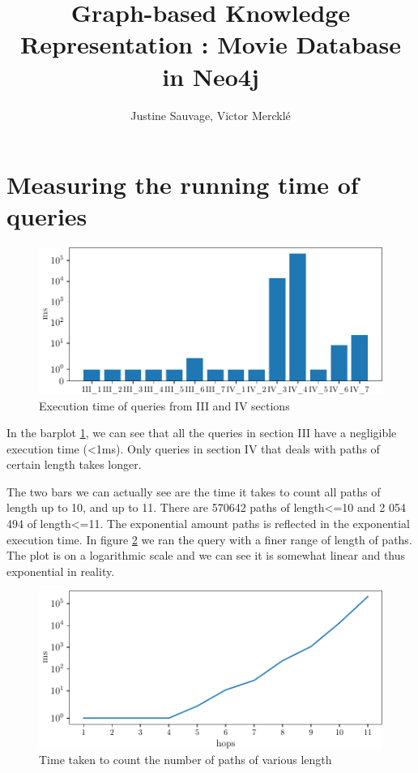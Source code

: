 \documentclass[a4paper, 12pt]{article}
\begin{document}
\title{Graph-based Knowledge Representation : Movie Database in Neo4j}
\author{Justine Sauvage, Victor Mercklé}
\maketitle



\section{Measuring the running time of queries}
\begin{figure}
\centering
\includegraphics[scale=0.8]{graphtime}
\caption{Execution time of queries from III and IV sections}
	\label{topkek}
\end{figure}

In the barplot \ref{topkek}, we can see that all the queries in section III have a negligible execution time (<1ms). Only queries in section IV that deals with paths of certain length takes longer.

The two bars we can actually see are the time it takes to count all paths of length up to 10, and up to 11. There are 570642 paths of length<=10 and 2 054 494 of length<=11. The exponential amount paths is reflected in the exponential execution time. In figure \ref{topkek2} we ran the query with a finer range of length of paths. The plot is on a logarithmic scale and we can see it is somewhat linear and thus exponential in reality.

\begin{figure}
\centering
\includegraphics[scale=0.8]{graphtime2}
	\caption{Time taken to count the number of paths of various length}
	\label{topkek2}
\end{figure}
\end{document}
